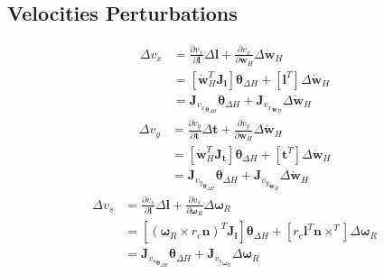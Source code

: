 \subsection{Velocities Perturbations}
\begin{equation}
    \begin{split}
        \Delta v_x &= \frac{\partial{v_x}}{\partial{\mathbf{l}}}\Delta \mathbf{l} + \frac{\partial{v_x}}{\partial{\dot{\mathbf{w}}_H}}\Delta {\dot{\mathbf{w}}}_H\\
        &= \left[\dot{\mathbf{w}}_H^T \mathbf{J}_\mathbf{l}\right] \boldsymbol{\theta}_{\Delta H} + \left[\mathbf{l}^T\right] \Delta {\dot{\mathbf{w}}}_H\\
        &= \mathbf{J}_{{v_x}_{\boldsymbol{\theta}_{\Delta H}}} \boldsymbol{\theta}_{\Delta H} + \mathbf{J}_{{v_x}_{\dot{\mathbf{w}}_H}} \Delta {\dot{\mathbf{w}}}_H
    \end{split}
\end{equation}
\begin{equation}
    \begin{split}
        \Delta v_y &= \frac{\partial{v_y}}{\partial{\mathbf{t}}}\Delta \mathbf{t} + \frac{\partial{v_y}}{\partial{\dot{\mathbf{w}}_H}}\Delta {\dot{\mathbf{w}}}_H\\
        &= \left[\dot{\mathbf{w}}_H^T \mathbf{J}_\mathbf{t}\right] \boldsymbol{\theta}_{\Delta H} + \left[\mathbf{t}^T\right] \Delta {\dot{\mathbf{w}}}_H\\
        &= \mathbf{J}_{{v_y}_{\boldsymbol{\theta}_{\Delta H}}} \boldsymbol{\theta}_{\Delta H} + \mathbf{J}_{{v_y}_{\dot{\mathbf{w}}_H}} \Delta {\dot{\mathbf{w}}}_H
    \end{split}
\end{equation}
\begin{equation}
    \begin{split}
        \Delta v_s &= \frac{\partial{v_s}}{\partial{\mathbf{l}}}\Delta \mathbf{l} + \frac{\partial{v_s}}{\partial{\boldsymbol{\omega}_R}}\Delta \boldsymbol{\omega}_R\\
        &= \left[\left(\boldsymbol{\omega}_R \times r_e \mathbf{n}\right)^T \mathbf{J}_\mathbf{l}\right] \boldsymbol{\theta}_{\Delta H} + \left[r_e \mathbf{l}^T \mathbf{n} \times ^T\right] \Delta \boldsymbol{\omega}_R\\
        &= \mathbf{J}_{{v_s}_{\boldsymbol{\theta}_{\Delta H}}} \boldsymbol{\theta}_{\Delta H} + \mathbf{J}_{{v_s}_{\boldsymbol{\omega}_R}} \Delta \boldsymbol{\omega}_R
    \end{split}
\end{equation}
